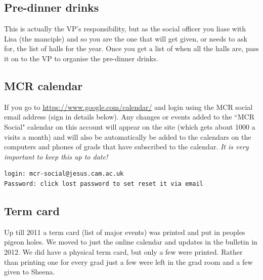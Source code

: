 \documentclass[9.5pt]{article} %
\begin{document}

\subsection{Pre-dinner drinks} %

This is actually the VP's responsibility, but as the social officer you liase with Lisa (the manciple) and so you are the one that will get given, or needs to ask for, the list of halls for the year. Once you get a list of when all the halls are, pass it on to the VP to organise the pre-dinner drinks.



\subsection{MCR calendar}

If you go to \url{https://www.google.com/calendar/} and login using the MCR social email address (sign in details below). Any changes or events added to the ``MCR Social" calendar on this account will appear on the site (which gets about 1000 a visits a month) and will also be automatically be added to the calendars on the computers and phones of grads that have subscribed to the calendar. \emph{It is very important to keep this up to date!}
\begin{verbatim}
login: mcr-social@jesus.cam.ac.uk
Password: click lost password to set reset it via email
\end{verbatim}



\subsection{Term card}

Up till 2011 a term card (list of major events) was printed and put in peoples pigeon holes. We moved to just the online calendar and updates in the bulletin in 2012. We did have a physical term card, but only a few were printed. Rather than printing one for every grad just a few were left in the grad room and a few given to Sheena. 
\end{document}
